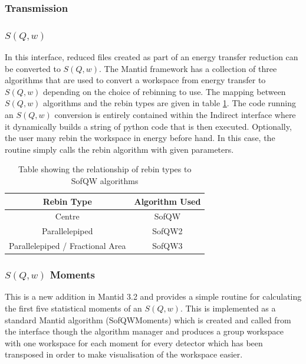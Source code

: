 \documentclass[paper=a4, fontsize=11pt]{scrartcl}	%
\numberwithin{equation}{section}															%
\numberwithin{figure}{section}																%
\numberwithin{table}{section}																%
\begin{document}
\subsubsection{Transmission}

\subsubsection{$S(Q,w)$}
In this interface, reduced files created as part of an energy transfer reduction can be converted to $S(Q,w)$. The Mantid framework has a collection of three algorithms that are used to convert a workspace from energy transfer to $S(Q,w)$ depending on the choice of rebinning to use. The mapping between $S(Q,w)$ algorithms and the rebin types are given in table \ref{table:sofqw-algorithms}. The code running an $S(Q,w)$ conversion is entirely contained within the Indirect interface where it dynamically builds a string of python code that is then executed. Optionally, the user many rebin the workspace in energy before hand. In this case, the routine simply calls the rebin algorithm with given parameters.

\begin{table}[H]
\begin{center}
\begin{tabular}{ c c}
Rebin Type & Algorithm Used \\ \hline
Centre & SofQW \\
Parallelepiped & SofQW2 \\
Parallelepiped / Fractional Area & SofQW3 \\
\end{tabular}
\caption{Table showing the relationship of rebin types to SofQW algorithms}
\label{table:sofqw-algorithms}
\end{center}
\end{table}

\subsubsection{$S(Q,w)$ Moments}
This is a new addition in Mantid 3.2 and provides a simple routine for calculating the first five statistical moments of an $S(Q,w)$. This is implemented as a standard Mantid algorithm (SofQWMoments) which is created and called from the interface though the algorithm manager and produces a group workspace with one workspace for each moment for every detector which has been transposed in order to make visualisation of the workspace easier.
\end{document}
